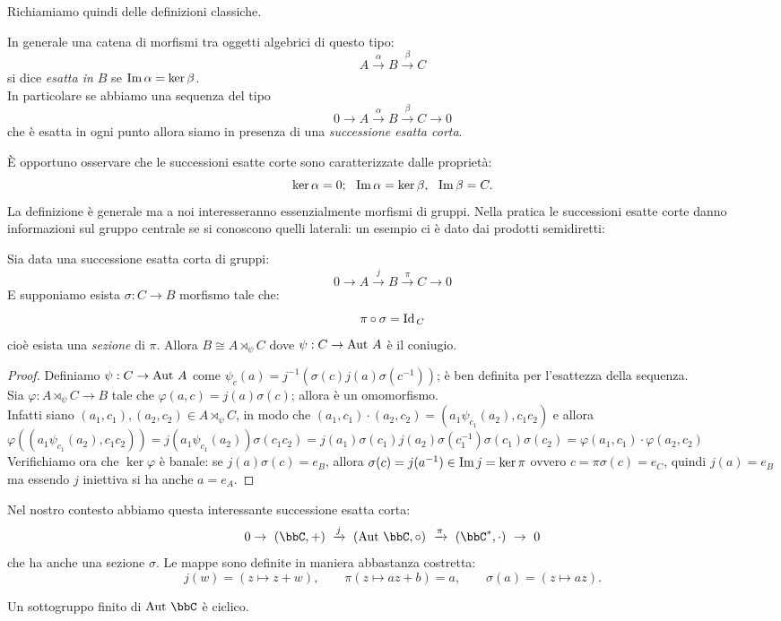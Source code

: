 Richiamiamo quindi delle definizioni classiche.

\begin{definizione} In generale una catena di morfismi tra oggetti algebrici di questo tipo:
$$ A\xrightarrow{\alpha}B\xrightarrow{\beta}C $$
si dice {\it esatta in $B$} se $\operatorname{Im}{\alpha}=\ker{\beta}$.\\
In particolare se abbiamo una sequenza del tipo
$$ 0\rightarrow A\xrightarrow{\alpha}B\xrightarrow{\beta}C \rightarrow 0 $$
che è esatta in ogni punto allora siamo in presenza di una {\it successione esatta corta}.
\end{definizione}
È opportuno osservare che le successioni esatte corte sono caratterizzate dalle proprietà:
$$ \ker \alpha =0;\ \ \operatorname{Im}\alpha =\ker\beta,\ \ \operatorname{Im}\beta =C. $$
La definizione è generale ma a noi interesseranno essenzialmente morfismi di gruppi.
Nella pratica le successioni esatte corte danno informazioni sul gruppo centrale se si conoscono quelli laterali: un esempio ci è dato dai prodotti semidiretti:
\begin{fatto}
Sia data una successione esatta corta di gruppi:
$$ 0\rightarrow A\xrightarrow{j}B\xrightarrow{\pi}C \rightarrow 0 $$
E supponiamo esista $\sigma:C\rightarrow B$ morfismo tale che:
$$
\pi\circ \sigma=\text{Id}_{\, C}
$$
cioè esista  una {\it sezione} di $\pi$. Allora $B\cong A\rtimes_\psi C$ dove $\psi:C
\rightarrow \text{Aut } A$ è il coniugio.
\end{fatto}
\begin{proof}
    Definiamo $\psi: C\to \text{Aut } A$ come $\psi_c(a)=j^{-1}\left( \sigma(c)j(a)\sigma(c^{-1}) \right)$; è ben definita per l'esattezza della sequenza.\\
    Sia $\varphi:A\rtimes_\psi C\to B$ tale che $\varphi(a,c)=j(a)\sigma(c)$; allora è un omomorfismo.\\
    Infatti siano $(a_1,c_1),(a_2,c_2)\in A\rtimes_\psi C$, in modo che $(a_1,c_1)\cdot(a_2,c_2)=(a_1\psi_{c_1}(a_2),c_1c_2)$ e allora $\varphi((a_1\psi_{c_1}(a_2),c_1c_2))=j(a_1\psi_{c_1}(a_2))\sigma(c_1c_2)=j(a_1)\sigma(c_1)j(a_2)\sigma(c_1^{-1})\sigma(c_1)\sigma(c_2)=\varphi(a_1,c_1)\cdot\varphi(a_2,c_2)$\\
    Verifichiamo ora che $\ker\varphi$ è banale: se $j(a)\sigma(c)=e_B$, allora $\sigma(c)=j(a^{-1})\in\operatorname{Im} j=\ker \pi$ ovvero $c=\pi\sigma(c)=e_C$, quindi $j(a)=e_B$ ma essendo $j$ iniettiva si ha anche $a=e_A$.
\end{proof}

Nel nostro contesto abbiamo questa interessante successione esatta corta:
$$
0\rightarrow\ (\bbC,+)\ \xrightarrow{j}\ (\Aut{\bbC},\circ)\ \xrightarrow{\pi}\ (\bbC^*,\cdot)\  \rightarrow\ 0
$$
che ha anche una sezione $\sigma$. Le mappe sono definite in maniera abbastanza costretta:
$$
j(w)=(z\mapsto z+w),\qquad \pi(z\mapsto az+b)=a,\qquad \sigma(a)=(z\mapsto az).
$$
\begin{esercizio}
Un sottogruppo finito di $\Aut{\bbC}$ è ciclico.
\end{esercizio}

